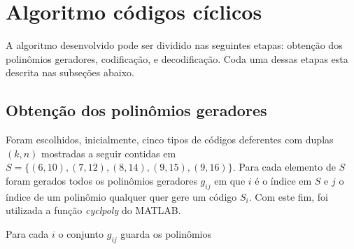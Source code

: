 \section{Algoritmo códigos cíclicos}
A algoritmo desenvolvido pode ser dividido nas seguintes etapas: obtenção dos polinômios geradores, codificação, e decodificação. Coda uma dessas etapas esta descrita nas subseções abaixo.

\subsection{Obtenção dos polinômios geradores}
Foram escolhidos, inicialmente, cinco tipos de códigos deferentes com duplas $(k, n)$ mostradas a seguir contidas em $S = \{(6, 10), (7, 12), (8, 14), (9, 15), (9, 16)\}$. Para cada elemento de $S$ foram gerados todos os polinômios geradores $g_{ij}$ em que $i$ é o índice em $S$ e $j$ o índice de um polinômio qualquer quer gere um código $S_i$. Com este fim, foi utilizada a função \textit{cyclpoly} do MATLAB.

Para cada $i$ o conjunto $g_{ij}$ guarda os polinômios
